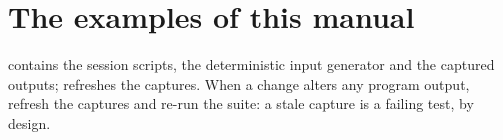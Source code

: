 \section{The examples of this manual}

 contains the session scripts, the deterministic
input generator and the captured outputs;  refreshes the
captures. When a change alters any program output, refresh the captures and
re-run the suite: a stale capture is a failing test, by design.
